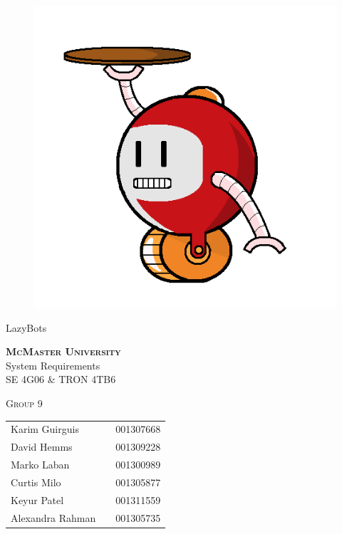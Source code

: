 \documentclass [11pt]{article}
\begin{document}
\begin {center} 

\thispagestyle{empty}
\vspace*{4.5cm}

\begin {figure}[h!]
\centering
\hspace{-10mm}\includegraphics [scale = .3, trim={.4cm 0 .8cm 0},clip] {Figures/alfred.png}
\end {figure}

{\fontfamily{\cabinfamily}\selectfont
\Huge{LazyBots} }

\vspace{1 cm}
{\Large \textbf{\textsc{McMaster University}}\\}  \vspace {1cm}
{\Large System Requirements\\ \vspace {0.4 cm} SE 4G06 \& TRON 4TB6}  \vspace {1cm}

{\large \textsc{Group 9} \\} \vspace{1cm}


\begin{tabular}{ l c  l}
Karim Guirguis & & 001307668 \\
David Hemms & & 001309228 \\
Marko Laban & & 001300989 \\
Curtis Milo & & 001305877 \\
Keyur Patel & & 001311559 \\
Alexandra Rahman & & 001305735
\end{tabular}

\end{center}
\end{document}
